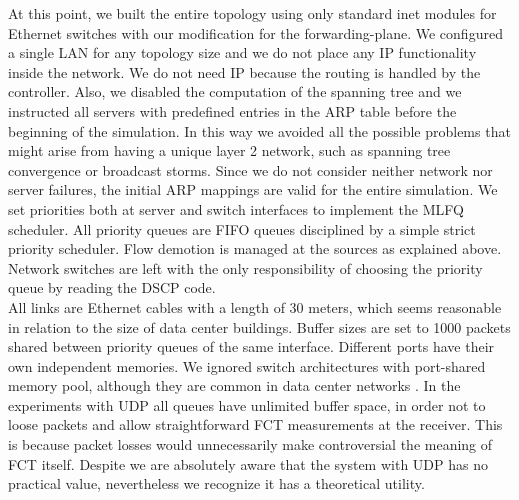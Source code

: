 At this point, we built the entire topology using only standard inet modules for Ethernet switches with our modification for the forwarding-plane. We configured a single LAN for any topology size and we do not place any IP functionality inside the network. We do not need IP because the routing is handled by the controller. Also, we disabled the computation of the spanning tree and we instructed all servers with predefined entries in the ARP table before the beginning of the simulation. In this way we avoided all the possible problems that might arise from having a unique layer 2 network, such as spanning tree convergence or broadcast storms. Since we do not consider neither network nor server failures, the initial ARP mappings are valid for the entire simulation. We set priorities both at server and switch interfaces to implement the MLFQ scheduler. All priority queues are FIFO queues disciplined by a simple strict priority scheduler. Flow demotion is managed at the sources as explained above. Network switches are left with the only responsibility of choosing the priority queue by reading the DSCP code. \\
All links are Ethernet cables with a length of 30 meters, which seems reasonable in relation to the size of data center buildings. Buffer sizes are set to 1000 packets shared between priority queues of the same interface. Different ports have their own independent memories. We ignored switch architectures with port-shared memory pool, although they are common in data center networks \cite{dctcp, mqecn}.  In the experiments with UDP all queues have unlimited buffer space, in order not to loose packets and allow straightforward FCT measurements at the receiver. This is because packet losses would unnecessarily make controversial the meaning of FCT itself. Despite we are absolutely aware that the system with UDP has no practical value, nevertheless we recognize it has a theoretical utility.
